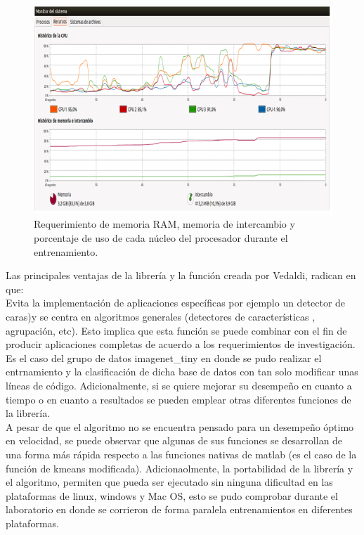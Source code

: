 \documentclass[10pt,twocolumn,letterpaper]{article}
\begin{document}
\begin{figure}[t]
\begin{center}
   \includegraphics[width=1\linewidth]{RAM.png}
\end{center}
   \caption{Requerimiento de memoria RAM, memoria de intercambio y porcentaje de uso de cada núcleo del procesador durante el entrenamiento.}
\label{fig:seg}
\end{figure}


Las principales ventajas de la librería y la función creada por Vedaldi, radican en que:\\

Evita la implementación de aplicaciones específicas por ejemplo un detector de caras)y se centra en algoritmos generales (detectores de características , agrupación, etc). Esto implica que esta función se puede combinar con el fin de producir aplicaciones completas de acuerdo a los requerimientos de investigación. Es el caso del grupo de datos imagenet\_tiny en donde se pudo realizar el entrnamiento y la clasificación de dicha base de datos con tan solo modificar unas líneas de código. Adicionalmente, si se quiere mejorar su desempeño en cuanto a tiempo o en cuanto a resultados se pueden emplear otras diferentes funciones de la librería.\\

A pesar de que el algoritmo no se encuentra pensado para un desempeño óptimo en velocidad, se puede observar que algunas de sus funciones se desarrollan de una forma más rápida respecto a las funciones nativas de matlab (es el caso de la función de kmeans modificada). Adicionaolmente, la portabilidad de la librería y el algoritmo, permiten que pueda ser ejecutado sin ninguna dificultad en las plataformas de linux, windows y Mac OS, esto se pudo comprobar durante el laboratorio en donde se corrieron de forma paralela entrenamientos en diferentes plataformas.
\end{document}
